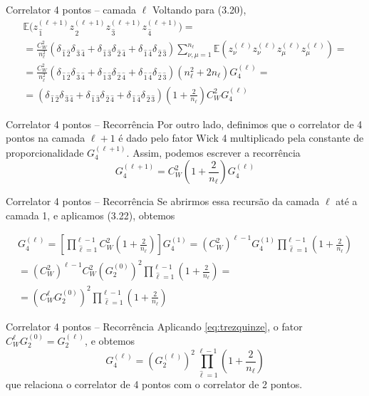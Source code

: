\documentclass{beamer}
\newcommand{\EE}{\mathbb{E}}
\def\mi#1{{\,\widehat{#1}}}
\def\eell{{(\ell)}}
\def\eellum{{(\ell+1)}}
\def\wickquatro{\delta_{\mi1\mi2}\delta_{\mi3\mi4} + \delta_{\mi1\mi3}\delta_{\mi2\mi4}+  \delta_{\mi1\mi4}\delta_{\mi2\mi3}}
\begin{document}
\begin{frame}{Correlator 4 pontos -- camada $\ell$}
	Voltando para (3.20),\small
	\begin{multline*}
		\EE\big(z^\eellum_{\mi1} z^\eellum_{\mi2} z^\eellum_{\mi3} z^\eellum_{\mi4}\big) = \\
		= \frac{C_W^2}{n_\ell^2}\left(\wickquatro \right)\sum_{\nu,\mu=1}^{n_\ell} \EE\left( z^\eell_{\nu}z^\eell_{\nu} z^\eell_{\mu}z^\eell_{\mu}\right)= \\
		= \frac{C_W^2}{n_\ell^2}\left(\wickquatro \right)\left(n_\ell^2 + 2n_\ell\right)G^\eell_4 = \\
		= \left(\wickquatro \right) \left(1 + \frac{2}{n_\ell}\right)C_W^2 G^\eell_4
	\end{multline*}
\end{frame}

\begin{frame}{Correlator 4 pontos -- Recorrência}
	Por outro lado, definimos que o correlator de 4 pontos na camada $\ell+1$ é dado pelo fator Wick 4 multiplicado pela constante de proporcionalidade $G_4^\eellum$. Assim, podemos escrever a recorrência
	\begin{equation*}\tag{3.24}
		G_4^{(\ell+1)} = {C_W^2}\left(1 + \frac{2}{n_\ell}\right)G_4^{(\ell)}
	\end{equation*}
\end{frame}

\begin{frame}{Correlator 4 pontos -- Recorrência}
	Se abrirmos essa recursão da camada $\ell$ até a camada 1, e aplicamos (3.22), obtemos

	\begin{multline*}
		G_4^\eell\! =\! \left[\prod_{\mi{\ell}=1}^{\ell-1}C_W^2\left(1 + \frac{2}{n_{\ell}}\right)\right]\!G_4^{(1)} 
		= \left(C_W^2\right)^{\ell-1}G_4^{(1)}\prod_{\mi{\ell}=1}^{\ell-1}\left(1 + \frac{2}{n_{\ell}}\right) \\ = \left(C_W^2\right)^{\ell-1}C_W^2\left(G_2^{(0)}\right)^2\prod_{\mi{\ell}=1}^{\ell-1}\left(1 + \frac{2}{n_{\ell}}\right)  = \\=  \left(C_W^{\ell}G_2^{(0)}\right)^2\prod_{\mi{\ell}=1}^{\ell-1}\left(1 + \frac{2}{n_{\ell}}\right)
	\end{multline*} 
\end{frame}

\begin{frame}{Correlator 4 pontos -- Recorrência}
	Aplicando \eqref{eq:trezquinze}, o fator $C_W^{\ell}G_2^{(0)} = G_2^\eell$, e obtemos
	\begin{equation*}\tag{3.25}
		G_4^\eell = \left(G_2^\eell\right)^2\prod_{\mi{\ell}=1}^{\ell-1}\left(1 + \frac{2}{n_{\ell}}\right)
	\end{equation*}
	que relaciona o correlator de 4 pontos com o correlator de 2 pontos.

\end{frame}
\end{document}
